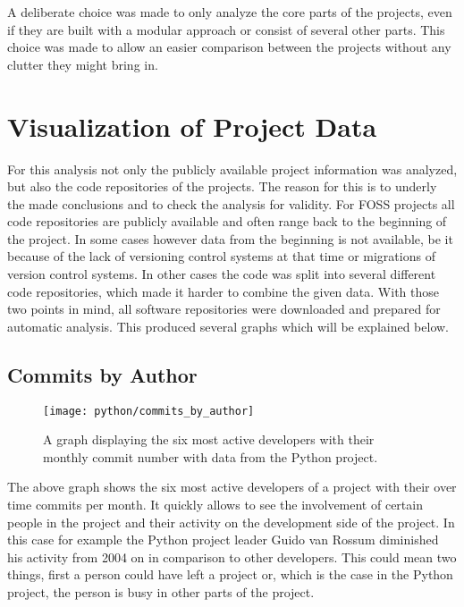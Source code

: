 A deliberate choice was made to only analyze the core parts of the projects,
even if they are built with a modular approach or consist of several other
parts. This choice was made to allow an easier comparison between the projects
without any clutter they might bring in.


\section{Visualization of Project Data} %

For this analysis not only the publicly available project information was
analyzed, but also the code repositories of the projects. The reason for this
is to underly the made conclusions and to check the analysis for validity. For
\ac{FOSS} projects all code repositories are publicly available and often range
back to the beginning of the project. In some cases however data from the
beginning is not available, be it because of the lack of versioning control
systems at that time or migrations of version control systems. In other cases
the code was split into several different code repositories, which made it
harder to combine the given data. With those two points in mind, all software
repositories were downloaded and prepared for automatic analysis. This produced
several graphs which will be explained below.

\subsection{Commits by Author} %

\begin{figure}[h!t]
  \centering
  \texttt{[image: python/commits\_by\_author]}
  \caption[The Commits by Author Graph]
  {A graph displaying the six most active developers with their monthly commit
    number with data from the Python project.}
\end{figure}

The above graph shows the six most active developers of a project with their
over time commits per month. It quickly allows to see the involvement of
certain people in the project and their activity on the development side of the
project. In this case for example the Python project leader Guido van Rossum
diminished his activity from 2004 on in comparison to other developers. This
could mean two things, first a person could have left a project or, which is
the case in the Python project, the person is busy in other parts of the
project.

